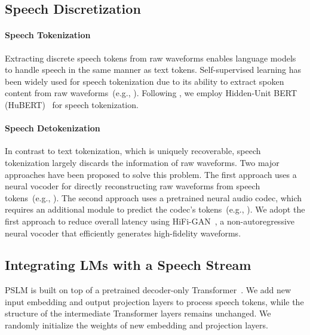 \subsection{Speech Discretization}
\label{sec:preliminary}

\paragraph{Speech Tokenization}
Extracting discrete speech tokens from raw waveforms enables language models to handle speech in the same manner as text tokens. 
Self-supervised learning has been widely used for speech tokenization due to its ability to extract spoken content from raw waveforms~(e.g., \citealt{rubenstein2023audiopalm,chou-etal-2023-toward,hassid2023twist}).
Following \citet{zhang-etal-2023-speechgpt}, we employ Hidden-Unit BERT (HuBERT)~\citep{hsu2021hubert} for speech tokenization.

\paragraph{Speech Detokenization}
In contrast to text tokenization, which is uniquely recoverable, speech tokenization largely discards the information of raw waveforms.
Two major approaches have been proposed to solve this problem.
The first approach uses a neural vocoder for directly reconstructing raw waveforms from speech tokens~(e.g., \citealt{zhang-etal-2023-speechgpt,chou-etal-2023-toward,hassid2023twist}).
The second approach uses a pretrained neural audio codec, which requires an additional module to predict the codec's tokens~(e.g., \citealt{rubenstein2023audiopalm,zhang2024speechgptgen}).
We adopt the first approach to reduce overall latency using HiFi-GAN~\citep{kong2020hifigan}, a non-autoregressive neural vocoder that efficiently generates high-fidelity waveforms.

\subsection{Integrating LMs with a Speech Stream}

PSLM is built on top of a pretrained decoder-only Transformer~\citep{vaswani2017transformer}.
We add new input embedding and output projection layers to process speech tokens, while the structure of the intermediate Transformer layers remains unchanged.
We randomly initialize the weights of new embedding and projection layers.

